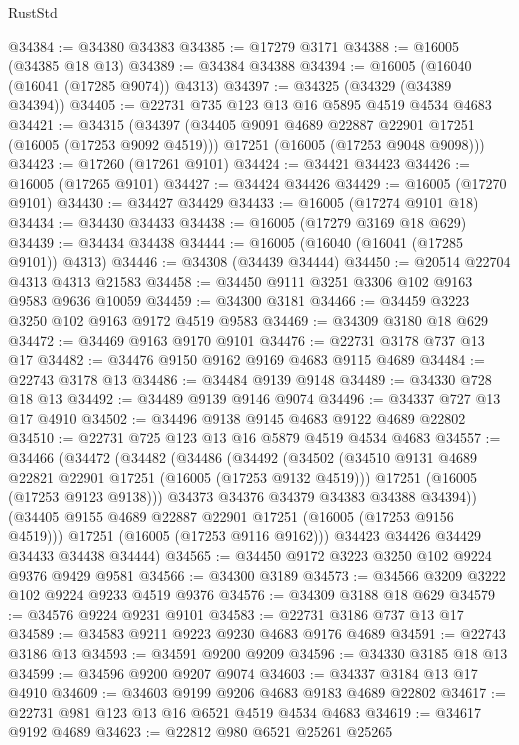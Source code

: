 \begin{lexlean}{RustStd}
\begin{coremodule}
@34384 := @34380 @34383
@34385 := @17279 @3171
@34388 := @16005 (@34385 @18 @13)
@34389 := @34384 @34388
@34394 := @16005 (@16040 (@16041 (@17285 @9074)) @4313)
@34397 := @34325 (@34329 (@34389 @34394))
@34405 := @22731 @735 @123 @13 @16 @5895 @4519 @4534 @4683
@34421 := @34315
    (@34397
      (@34405 @9091 @4689 @22887 @22901 @17251 (@16005 (@17253 @9092 @4519)))
      @17251
      (@16005 (@17253 @9048 @9098)))
@34423 := @17260 (@17261 @9101)
@34424 := @34421 @34423
@34426 := @16005 (@17265 @9101)
@34427 := @34424 @34426
@34429 := @16005 (@17270 @9101)
@34430 := @34427 @34429
@34433 := @16005 (@17274 @9101 @18)
@34434 := @34430 @34433
@34438 := @16005 (@17279 @3169 @18 @629)
@34439 := @34434 @34438
@34444 := @16005 (@16040 (@16041 (@17285 @9101)) @4313)
@34446 := @34308 (@34439 @34444)
@34450 := @20514 @22704 @4313 @4313 @21583
@34458 := @34450 @9111 @3251 @3306 @102 @9163 @9583 @9636 @10059
@34459 := @34300 @3181
@34466 := @34459 @3223 @3250 @102 @9163 @9172 @4519 @9583
@34469 := @34309 @3180 @18 @629
@34472 := @34469 @9163 @9170 @9101
@34476 := @22731 @3178 @737 @13 @17
@34482 := @34476 @9150 @9162 @9169 @4683 @9115 @4689
@34484 := @22743 @3178 @13
@34486 := @34484 @9139 @9148
@34489 := @34330 @728 @18 @13
@34492 := @34489 @9139 @9146 @9074
@34496 := @34337 @727 @13 @17 @4910
@34502 := @34496 @9138 @9145 @4683 @9122 @4689 @22802
@34510 := @22731 @725 @123 @13 @16 @5879 @4519 @4534 @4683
@34557 := @34466
    (@34472
      (@34482
        (@34486
          (@34492
            (@34502
              (@34510 @9131 @4689 @22821 @22901 @17251 (@16005 (@17253 @9132 @4519)))
              @17251
              (@16005 (@17253 @9123 @9138)))
            @34373
            @34376
            @34379
            @34383
            @34388
            @34394))
        (@34405 @9155 @4689 @22887 @22901 @17251 (@16005 (@17253 @9156 @4519)))
        @17251
        (@16005 (@17253 @9116 @9162)))
      @34423
      @34426
      @34429
      @34433
      @34438
      @34444)
@34565 := @34450 @9172 @3223 @3250 @102 @9224 @9376 @9429 @9581
@34566 := @34300 @3189
@34573 := @34566 @3209 @3222 @102 @9224 @9233 @4519 @9376
@34576 := @34309 @3188 @18 @629
@34579 := @34576 @9224 @9231 @9101
@34583 := @22731 @3186 @737 @13 @17
@34589 := @34583 @9211 @9223 @9230 @4683 @9176 @4689
@34591 := @22743 @3186 @13
@34593 := @34591 @9200 @9209
@34596 := @34330 @3185 @18 @13
@34599 := @34596 @9200 @9207 @9074
@34603 := @34337 @3184 @13 @17 @4910
@34609 := @34603 @9199 @9206 @4683 @9183 @4689 @22802
@34617 := @22731 @981 @123 @13 @16 @6521 @4519 @4534 @4683
@34619 := @34617 @9192 @4689
@34623 := @22812 @980 @6521 @25261 @25265

\end{coremodule}
\end{lexlean}
